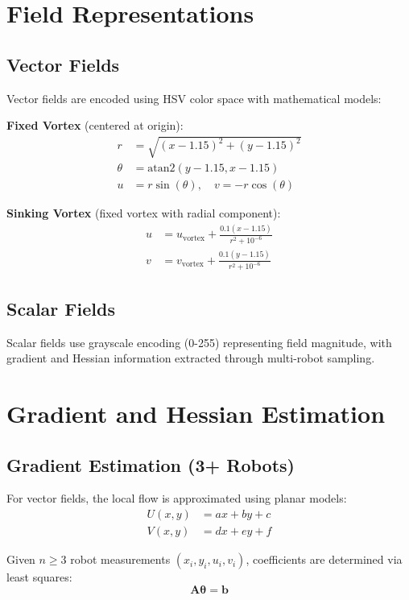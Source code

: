 \documentclass{article}
\begin{document}
\section{Field Representations}

\subsection{Vector Fields}

Vector fields are encoded using HSV color space with mathematical models:

\textbf{Fixed Vortex} (centered at origin):
\begin{align}
r &= \sqrt{(x - 1.15)^2 + (y - 1.15)^2} \\
\theta &= \text{atan2}(y - 1.15, x - 1.15) \\
u &= r \sin(\theta), \quad v = -r \cos(\theta)
\end{align}

\textbf{Sinking Vortex} (fixed vortex with radial component):
\begin{align}
u &= u_{\text{vortex}} + \frac{0.1(x - 1.15)}{r^2 + 10^{-6}} \\
v &= v_{\text{vortex}} + \frac{0.1(y - 1.15)}{r^2 + 10^{-6}}
\end{align}

\subsection{Scalar Fields}

Scalar fields use grayscale encoding (0-255) representing field magnitude, with gradient and Hessian information extracted through multi-robot sampling.

\section{Gradient and Hessian Estimation}

\subsection{Gradient Estimation (3+ Robots)}

For vector fields, the local flow is approximated using planar models:
\begin{align}
U(x,y) &= ax + by + c \\
V(x,y) &= dx + ey + f
\end{align}

Given $n \geq 3$ robot measurements $(x_i, y_i, u_i, v_i)$, coefficients are determined via least squares:
\begin{equation}
\mathbf{A}\boldsymbol{\theta} = \mathbf{b}
\end{equation}
\end{document}
